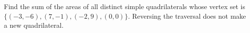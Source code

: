 Find the sum of the areas of all distinct simple quadrilaterals whose vertex set is $\{(-3,-6),(7,-1),(-2,9),(0,0)\}$. Reversing the traversal does not make a new quadrilateral.
